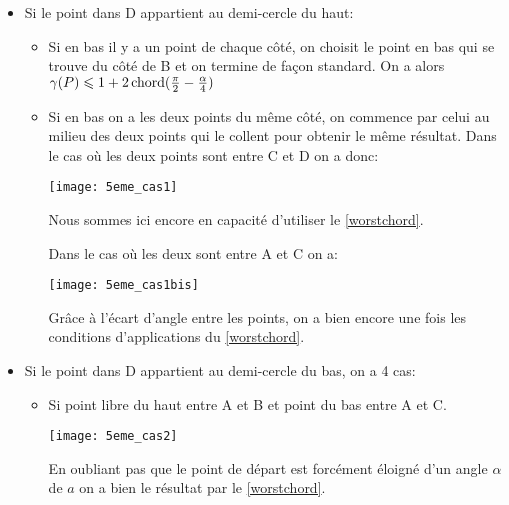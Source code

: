 \begin{itemize}

\item \label{5cas1} Si le point dans D appartient au demi-cercle du haut:

\begin{itemize}

\item \label{5cas11} Si en bas il y a un point de chaque côté, on choisit le point en bas qui se trouve du côté de B et on termine de façon standard. On a alors $\gamma(P) \leqslant 1 + 2\operatorname{chord}(\frac{\pi}{2} - \frac{\alpha}{4})$

\item \label{5cas12} Si en bas on a les deux points du même côté, on commence par celui au milieu des deux points qui le collent pour obtenir le même résultat.
Dans le cas où les deux points sont entre C et D on a donc:

  \texttt{[image: 5eme\_cas1]}\label{fig:5eme_cas1}

Nous sommes ici encore en capacité d'utiliser le \cref{worstchord}.

\label{5cas13} Dans le cas où les deux sont entre A et C on a:

  \texttt{[image: 5eme\_cas1bis]}\label{fig:5eme_cas1bis}

Grâce à l'écart d'angle entre les points, on a bien encore une fois les
conditions d'applications du \cref{worstchord}.

\end{itemize}

\item \label{5cas2} Si le point dans D appartient au demi-cercle du bas, on a 4 cas:

\begin{itemize}

\item \label{5cas21} Si point libre du haut entre A et B et point du bas entre A et C.

  \texttt{[image: 5eme\_cas2]}\label{fig:5eme_cas2}

En oubliant pas que le point de départ est forcément éloigné d'un angle $\alpha$ de $a$ on a bien le résultat par le \cref{worstchord}.


\end{itemize}
\end{itemize}
